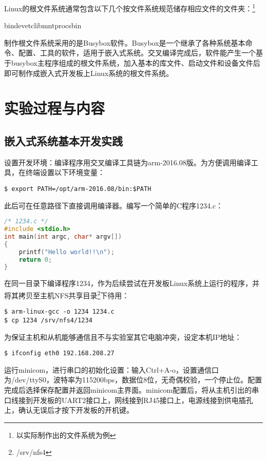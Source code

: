 \documentclass[hyperref,UTF8]{ctexart}
\begin{document}
Linux的根文件系统通常包含以下几个按文件系统规范储存相应文件的文件夹：\footnote{以实际制作出的文件系统为例}

bin\qquad dev\qquad etc\qquad lib\qquad mnt\qquad proc\qquad sbin\qquad

制作根文件系统采用的是Busybox软件。Busybox是一个继承了各种系统基本命令、配置、工具的软件，适用于嵌入式系统。交叉编译完成后，软件能产生一个基于busybox主程序组成的根文件系统，加入基本的库文件、启动文件和设备文件后即可制作成嵌入式开发板上Linux系统的根文件系统。

\section{实验过程与内容}\label{sec:exp-content}

\subsection{嵌入式系统基本开发实践}\label{subsec:basic-exp}
设置开发环境：编译程序用交叉编译工具链为arm-2016.08版。为方便调用编译工具，在终端设置以下环境变量：
\begin{Verbatim}[frame=single]
$ export PATH=/opt/arm-2016.08/bin:$PATH
\end{Verbatim}
此后可在任意路径下直接调用编译器。编写一个简单的C程序1234.c：
\begin{lstlisting}[language=C,flexiblecolumns]
/* 1234.c */
#include <stdio.h>
int main(int argc, char* argv[])
{
    printf("Hello world!!\n");
    return 0;
}
\end{lstlisting}

在同一目录下编译程序1234，作为后续尝试在开发板Linux系统上运行的程序，并将其拷贝至主机NFS共享目录\footnote{/srv/nfs4}下待用：
\begin{Verbatim}[frame=single]
$ arm-linux-gcc -o 1234 1234.c
$ cp 1234 /srv/nfs4/1234
\end{Verbatim}

为保证主机和从机能够通信且不与实验室其它电脑冲突，设定本机IP地址：
\begin{Verbatim}[frame=single]
$ ifconfig eth0 192.168.208.27
\end{Verbatim}

运行minicom，进行串口的初始化设置：输入Ctrl+A-o，设置通信口为/dev/ttyS0，波特率为115200bps，数据位8位，无奇偶校验，一个停止位。配置完成后选择保存配置并返回minicom主界面。minicom配置后，将从主机引出的串口线接到开发板的UART2接口上，网线接到RJ45接口上，电源线接到供电插孔上，确认无误后才按下开发板的开机键。
\end{document}
